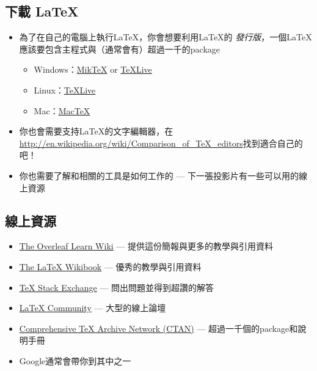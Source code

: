 \documentclass{beamer}
\begin{document}
\subsection{下載 \LaTeX{}}
\begin{frame}{\insertsubsection}
\begin{itemize}
\item 為了在自己的電腦上執行\LaTeX{}，你會想要利用\LaTeX{}的
\emph{發行版}，一個\LaTeX{}應該要包含主程式與（通常會有）超過一千的package
\begin{itemize}
\item Windows：\href{http://miktex.org/}{Mik\TeX} or \href{http://tug.org/texlive/}{\TeX Live}
\item Linux：\href{http://tug.org/texlive/}{\TeX Live}
\item Mac：\href{http://tug.org/mactex/}{Mac\TeX}
\end{itemize}
\item 你也會需要支持\LaTeX{}的文字編輯器，在\url{http://en.wikipedia.org/wiki/Comparison_of_TeX_editors}找到適合自己的吧！
\item 你也需要了解和相關的工具是如何工作的 --- 下一張投影片有一些可以用的線上資源
\end{itemize}
\end{frame}

\subsection{線上資源}
\begin{frame}{\insertsubsection}
\begin{itemize}
\item \href{https://www.overleaf.com/learn}{The Overleaf Learn Wiki} ---
提供這份簡報與更多的教學與引用資料
\item \href{http://en.wikibooks.org/wiki/LaTeX}{The \LaTeX{} Wikibook} ---
優秀的教學與引用資料
\item \href{http://tex.stackexchange.com/}{\TeX{} Stack Exchange} --- 
問出問題並得到超讚的解答
\item \href{http://www.latex-community.org/}{\LaTeX{} Community} --- 大型的線上論壇
\item \href{http://ctan.org/}{Comprehensive \TeX{} Archive Network (CTAN)} ---
超過一千個的package和說明手冊
\item Google通常會帶你到其中之一
\end{itemize}
\end{frame}
\end{document}

